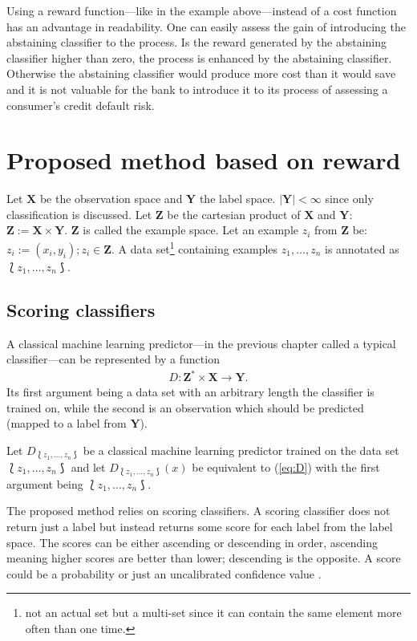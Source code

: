 \documentclass[twoside,11pt]{article}
\def\ds{\Lbag z_1,\dots,z_n \Rbag}
\begin{document}
Using a reward function---like in the example
above---instead of a cost function has an advantage in
readability. One can easily assess the gain of introducing
the abstaining classifier to the process.
Is the reward generated by the abstaining classifier higher
than zero, the process is enhanced by the abstaining
classifier.
Otherwise the abstaining classifier would produce more
cost than it would save and it is not valuable for the
bank to introduce it to its process of assessing a
consumer's credit default risk.

\section{Proposed method based on reward}
\label{sec:method}

Let $\textbf{X}$ be the observation space and $\textbf{Y}$
the label space. $|\textbf{Y}| < \infty$ since only
classification is discussed. Let $\textbf{Z}$ be the
cartesian product of $\textbf{X}$ and $\textbf{Y}$:
$\textbf{Z} := \textbf{X} \times \textbf{Y}$.
$\textbf{Z}$ is called the example space.
Let an example $z_i$ from $\textbf{Z}$ be:
$z_i := (x_i, y_i); z_i \in \textbf{Z}$.
A data set\footnote{not an actual set but a multi-set since
it can contain the same element more often than one time.}
containing examples $z_1,\dots,z_n$ is annotated as
$\ds$.

\subsection{Scoring classifiers}

A classical machine learning predictor---in the previous
chapter called a typical classifier---can be represented
by a function
\begin{align}
  \label{eq:D}
  D: \textbf{Z}^* \times \textbf{X} \rightarrow \textbf{Y}.
\end{align}
Its first argument being a data set with an arbitrary
length the classifier is trained on, while the second is an
observation which should be predicted
(mapped to a label from $\textbf{Y}$).

Let $D_{\ds}$ be a classical machine
learning predictor trained on the data set $\ds$ and
let $D_{\ds}(x)$ be equivalent to (\ref{eq:D}) with the
first argument being $\ds$.

The proposed method relies on scoring classifiers.
A scoring classifier does not return just
a label but instead returns some score for each label from
the label space.
The scores can be either ascending or descending in order,
ascending meaning higher scores are better than lower;
descending is the opposite.
A score could be a probability or just an uncalibrated
confidence value \citep[see][]{vanderlooy_et_al_2009}.
\end{document}
